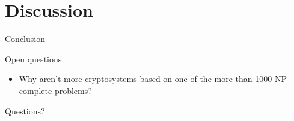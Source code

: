\documentclass{beamer}
\begin{document}
\section{Discussion}

\begin{frame}{Conclusion}
\end{frame}

\begin{frame}{Open questions}
\begin{itemize}[\textbullet]

	\item Why aren't more cryptosystems based on one of the more than 1000 NP-complete problems? 
\end{itemize}
\end{frame}

\begin{frame}{Questions?}

\end{frame}
\end{document}
